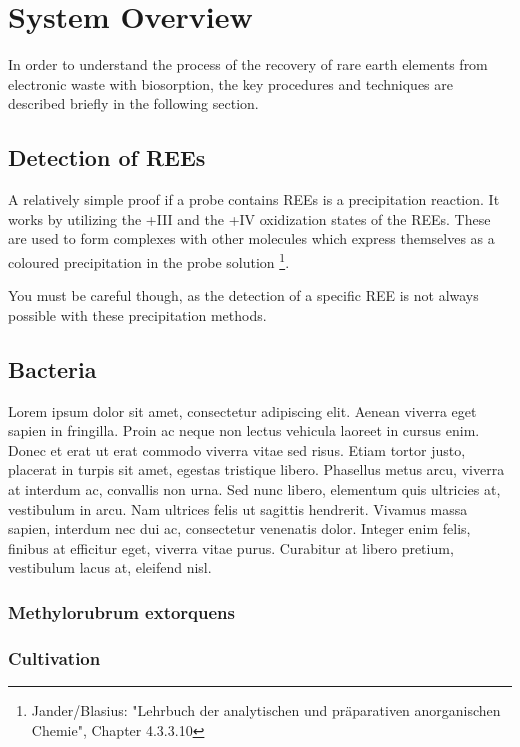 \chapter{System Overview}

In order to understand the process of the recovery of rare earth elements from electronic waste with biosorption, the key procedures and techniques are described briefly in the following section.

\section{Detection of REEs\authorA}

A relatively simple proof if a probe contains REEs is a precipitation reaction. It works by utilizing the +III and the +IV oxidization states of the REEs. These are used to form complexes with other molecules which express themselves as a coloured precipitation in the probe solution \footnote{Jander/Blasius: "Lehrbuch der analytischen und präparativen anorganischen Chemie", Chapter 4.3.3.10}.

You must be careful though, as the detection of a specific REE is not always possible with these precipitation methods. 

\section{Bacteria}

Lorem ipsum dolor sit amet, consectetur adipiscing elit. Aenean viverra eget sapien in fringilla. Proin ac neque non lectus vehicula laoreet in cursus enim. Donec et erat ut erat commodo viverra vitae sed risus. Etiam tortor justo, placerat in turpis sit amet, egestas tristique libero. Phasellus metus arcu, viverra at interdum ac, convallis non urna. Sed nunc libero, elementum quis ultricies at, vestibulum in arcu. Nam ultrices felis ut sagittis hendrerit. Vivamus massa sapien, interdum nec dui ac, consectetur venenatis dolor. Integer enim felis, finibus at efficitur eget, viverra vitae purus. Curabitur at libero pretium, vestibulum lacus at, eleifend nisl.

\subsection{Methylorubrum extorquens}

\subsection{Cultivation}

